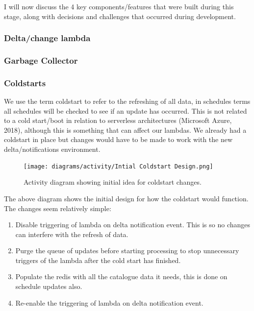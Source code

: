   I will now discuss the 4 key components/features that were built during this stage, along with decisions and challenges that occurred during development.

  \newpage
  \subsubsection{Delta/change lambda}

  \newpage
  \subsubsection{Garbage Collector}

  \newpage
  \subsubsection{Coldstarts}
  We use the term coldstart to refer to the refreshing of all data, in schedules terms all schedules will be checked to see if an update has occurred.
  This is not related to a cold start/boot in relation to serverless architectures (Microsoft Azure, 2018), although this is something that can affect 
  our lambdas. We already had a coldstart in place but changes would have to be made to work with the new delta/notifications environment.

  \begin{figure}[H]
    \centering
    \texttt{[image: diagrams/activity/Intial Coldstart Design.png]}
    \caption{Activity diagram showing initial idea for coldstart changes.}
    \label{fig:initialColdstart}
  \end{figure}

  The above diagram shows the initial design for how the coldstart would function. The changes seem relatively simple:
  \begin{enumerate}
    \item Disable triggering of lambda on delta notification event. This is so no changes can interfere with the refresh of data.
    \item Purge the queue of updates before starting processing to stop unnecessary triggers of the lambda after the cold start has finished.
    \item Populate the redis with all the catalogue data it needs, this is done on schedule updates also. 
    \item Re-enable the triggering of lambda on delta notification event.
  \end{enumerate}

